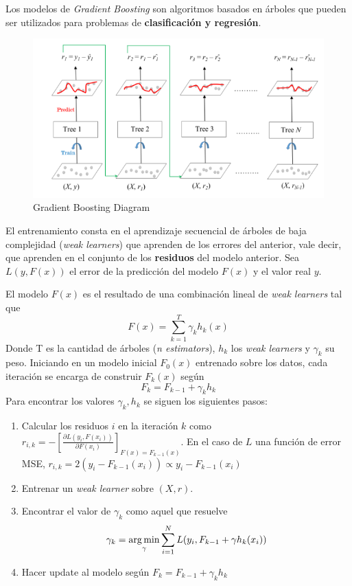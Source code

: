 Los modelos de \textit{Gradient Boosting} son algoritmos basados en árboles que pueden ser utilizados para problemas de \textbf{clasificación y regresión}. 

\begin{figure}[H]
    \center
    \includegraphics[scale=0.5]{notebooks/ML/img/gbc_diagram.png}
    \caption{Gradient Boosting Diagram}
\end{figure}

El entrenamiento consta en el aprendizaje secuencial de árboles de baja complejidad (\textit{weak learners}) que aprenden de los errores del anterior, vale decir, que aprenden en el conjunto de los \textbf{residuos} del modelo anterior. Sea $L(y , F(x))$ el error de la predicción del modelo $F(x)$ y el valor real $y$. 

El modelo $F(x)$ es el resultado de una combinación lineal de \textit{weak learners} tal que 
$$ 
F(x) = \sum_{k=1}^T \gamma_k h_k(x)
$$
Donde T es la cantidad de árboles (\textit{n estimators}), $h_k$ los  \textit{weak learners} y $\gamma_k$ su peso. Iniciando en un modelo inicial $F_0(x)$ entrenado sobre los datos, cada iteración se encarga de construir $F_{k}(x)$ según 
$$ 
F_{k} = F_{k-1} + \gamma_{k}h_{k}
$$
Para encontrar los valores $\gamma_{k} , h_{k}$ se siguen los siguientes pasos: 
\begin{enumerate}
    \item Calcular los residuos $i$ en la iteración $k$ como $r_{i,k} = - \left [ \frac{\partial L(y_i, F(x_i))}{\partial F(x_i)} \right ]_{F(x) = F_{k-1}(x)}$. En el caso de $L$ una función de error MSE, $r_{i,k} = 2(y_i - F_{k-1}(x_i)) \propto y_i - F_{k-1}(x_i)$
    \item Entrenar un \textit{weak learner} sobre $(X, r)$.
    \item Encontrar el valor de $\gamma_k$ como aquel que resuelve 
    $$ 
    \gamma_k = \operatorname*{arg\,min}_{\gamma}\sum_{i=1}^N L(y_i , F_{k-1} + \gamma h_{k}(x_i))
    $$
    \item Hacer update al modelo según $F_{k} = F_{k-1} + \gamma_{k}h_{k}$
\end{enumerate}

